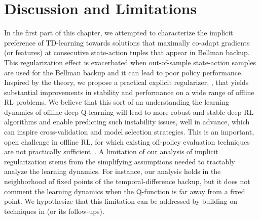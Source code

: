 \documentclass[../thesis.tex]{subfiles}
\begin{document}
\vspace{-0.2cm}
\section{Discussion and Limitations}
\vspace{-0.2cm}

In the first part of this chapter, we attempted to characterize the implicit preference of TD-learning towards solutions that maximally co-adapt gradients (or features) at consecutive state-action tuples that appear in Bellman backup. This regularization effect is exacerbated when out-of-sample
state-action samples are used for the Bellman backup and it can lead to poor policy performance. Inspired by the theory, we propose a practical explicit regularizer, \drmethodname, that yields substantial improvements in stability and performance on a wide range of offline RL problems. We believe that this sort of an understanding the learning dynamics of offline deep Q-learning will lead to more robust and stable deep RL algorithms and enable predicting such instability issues, well in advance, which can inspire cross-validation and model selection strategies. This is an important, open challenge in offline RL, for which existing off-policy evaluation techniques are not practically sufficient~\citep{fu2021benchmarks,kumar2021workflow}. 
A limitation of our analysis of implicit regularization stems from the simplifying assumptions needed to tractably analyze the learning dynamics. For instance, our analysis holds in the neighborhood of fixed points of the temporal-difference backup, but it does not comment the learning dynamics when the Q-function is far away from a fixed point. We hypothesize that this limitation can be addressed by building on techniques in \citet{damian2021label} (or its follow-ups).   
\end{document}
